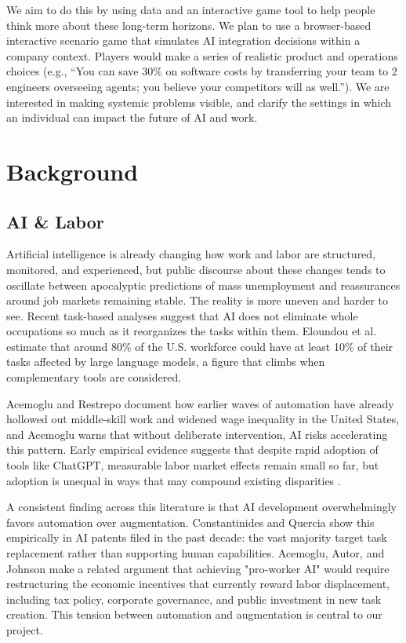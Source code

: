 \documentclass[sigconf,authordraft]{acmart}
\begin{document}
We aim to do this by using data and an interactive game tool to help people think more about these long-term horizons. We plan to use a browser-based interactive scenario game that simulates AI integration decisions within a company context. Players would make a series of realistic product and operations choices (e.g., “You can save 30\% on software costs by transferring your team to 2 engineers overseeing agents; you believe your competitors will as well.”). We are interested in making systemic problems visible, and clarify the settings in which an individual can impact the future of AI and work.




\section{Background}


\subsection{AI \& Labor}


Artificial intelligence is already changing how work and labor are structured, monitored, and experienced, but public discourse about these changes tends to oscillate between apocalyptic predictions of mass unemployment and reassurances around job markets remaining stable. The reality is more uneven and harder to see. Recent task-based analyses suggest that AI does not eliminate whole occupations so much as it reorganizes the tasks within them. Eloundou et al.~\cite{eloundou2024gpts} estimate that around 80\% of the U.S. workforce could have at least 10\% of their tasks affected by large language models, a figure that climbs when complementary tools are considered.

Acemoglu and Restrepo \cite{acemoglu2022tasks} document how earlier waves of automation have already hollowed out middle-skill work and widened wage inequality in the United States, and Acemoglu \cite{acemoglu2025simple} warns that without deliberate intervention, AI risks accelerating this pattern. Early empirical evidence suggests that despite rapid adoption of tools like ChatGPT, measurable labor market effects remain small so far, but adoption is unequal in ways that may compound existing disparities \cite{humlum2025llm}.

A consistent finding across this literature is that AI development overwhelmingly favors automation over augmentation. Constantinides and Quercia \cite{constantinides2025ai} show this empirically in AI patents filed in the past decade: the vast majority target task replacement rather than supporting human capabilities. Acemoglu, Autor, and Johnson \cite{acemoglu2023proworker} make a related argument that achieving "pro-worker AI" would require restructuring the economic incentives that currently reward labor displacement, including tax policy, corporate governance, and public investment in new task creation. This tension between automation and augmentation is central to our project.
\end{document}
